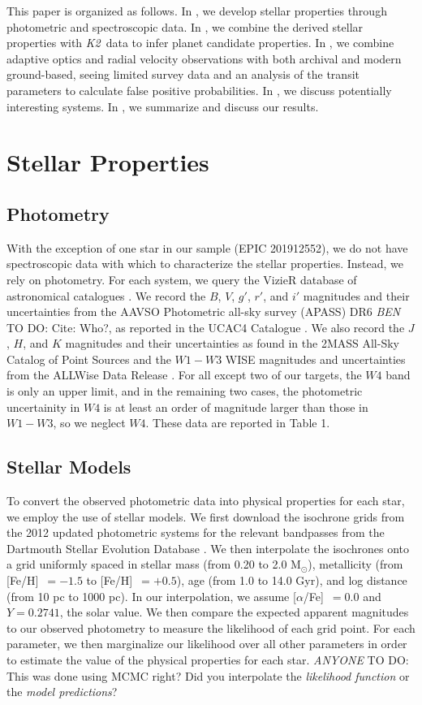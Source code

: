 \documentclass{emulateapj}
\newcommand{\project}[1]{\textsl{#1}}
\newcommand{\KT}{\project{K2}}
\newcommand{\msun}{{M$_\odot$}}
\newcommand{\feh}{{[Fe/H]}~}
\newcommand{\afe}{{[$\alpha$/Fe]}~}
\newcommand{\todo}[3]{{\color{#2} \emph{#1} TO DO: #3}}
\newcommand{\btmtodo}[1]{\todo{BEN}{red}{#1}}
\newcommand{\anytodo}[1]{\todo{ANYONE}{NavyBlue}{#1}}
\begin{document}
This paper is organized as follows.
In , we develop stellar properties through
photometric and spectroscopic data.
In , we combine the derived stellar properties with \KT\ data to infer planet
candidate properties.
In , we combine adaptive optics and radial velocity observations with both
archival and modern ground-based, seeing limited survey data and an analysis of the
transit parameters to calculate false positive probabilities.
In , we discuss potentially interesting systems.
In , we summarize and discuss our results.


\section{Stellar Properties}
\subsection{Photometry}

With the exception of one star in our sample (EPIC 201912552), we do not have
spectroscopic data with which to characterize the stellar properties.
Instead, we rely on photometry.
For each system, we query the VizieR database of astronomical catalogues
\citep{Ochseinbein00}.
We record the $B$, $V$, $g'$, $r'$, and $i'$ magnitudes and their
uncertainties from the AAVSO Photometric all-sky survey (APASS) DR6
\btmtodo{Cite: Who?}, as reported in the UCAC4 Catalogue \citep{Zacharias12}.
We also record the $J$, $H$, and $K$ magnitudes and their uncertainties
as found in the 2MASS All-Sky Catalog of Point Sources \citep{Cutri03}
and the $W1-W3$ WISE magnitudes and uncertainties from the ALLWise Data
Release \citep{Cutri13}.
For all except two of our targets, the $W4$ band is only an upper limit,
and in the remaining two cases, the photometric uncertainity in $W4$ is at least an
order of magnitude larger than those in $W1-W3$, so we neglect $W4$.
These data are reported in Table 1.


\subsection{Stellar Models}
To convert the observed photometric data into physical properties for each
star, we employ the use of stellar models.
We first download the isochrone grids from the 2012 updated photometric
systems for the relevant bandpasses from the Dartmouth Stellar Evolution
Database \citep{Dotter08}.
We then interpolate the isochrones onto a grid uniformly spaced in
stellar mass (from 0.20 to 2.0 \msun), metallicity (from \feh$=-1.5$ to
\feh$=+0.5$), age (from 1.0 to 14.0 Gyr), and log distance (from 10 pc to
1000 pc).
In our interpolation, we assume \afe$=0.0$ and $Y=0.2741$, the solar value.
We then compare the expected apparent magnitudes to our observed photometry
to measure the likelihood of each grid point.
For each parameter, we then marginalize our likelihood over all other
parameters in order to estimate the value of the physical properties
for each star.
\anytodo{This was done using MCMC right? Did you interpolate the
\emph{likelihood function} or the \emph{model predictions}?}
\end{document}
